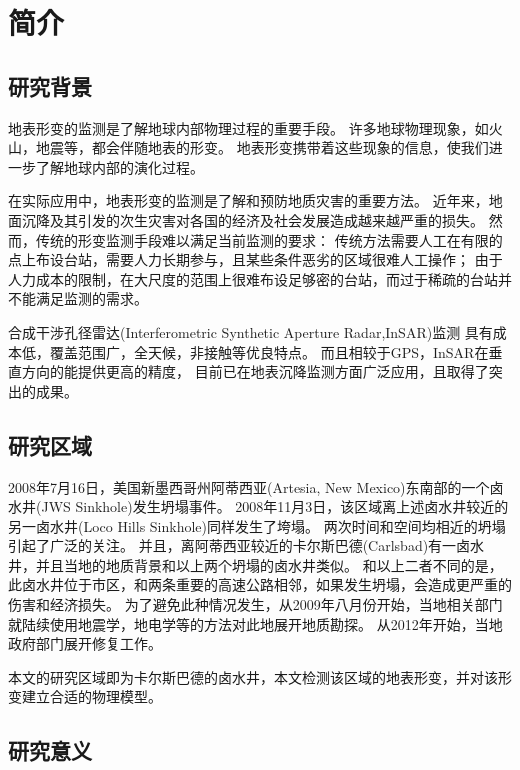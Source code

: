 
\chapter{简介}

\section{研究背景}

地表形变的监测是了解地球内部物理过程的重要手段。
许多地球物理现象，如火山，地震等，都会伴随地表的形变。
地表形变携带着这些现象的信息，使我们进一步了解地球内部的演化过程。

在实际应用中，地表形变的监测是了解和预防地质灾害的重要方法。
近年来，地面沉降及其引发的次生灾害对各国的经济及社会发展造成越来越严重的损失。
然而，传统的形变监测手段难以满足当前监测的要求：
传统方法需要人工在有限的点上布设台站，需要人力长期参与，且某些条件恶劣的区域很难人工操作；
由于人力成本的限制，在大尺度的范围上很难布设足够密的台站，而过于稀疏的台站并不能满足监测的需求。

合成干涉孔径雷达(Interferometric Synthetic Aperture Radar,InSAR)监测
具有成本低，覆盖范围广，全天候，非接触等优良特点。
而且相较于GPS，InSAR在垂直方向的能提供更高的精度，
目前已在地表沉降监测方面广泛应用，且取得了突出的成果。

\section{研究区域}

2008年7月16日，美国新墨西哥州阿蒂西亚(Artesia, New Mexico)东南部的一个卤水井(JWS Sinkhole)发生坍塌事件。
2008年11月3日，该区域离上述卤水井较近的另一卤水井(Loco Hills Sinkhole)同样发生了垮塌。
两次时间和空间均相近的坍塌引起了广泛的关注。
并且，离阿蒂西亚较近的卡尔斯巴德(Carlsbad)有一卤水井，并且当地的地质背景和以上两个坍塌的卤水井类似。
和以上二者不同的是，此卤水井位于市区，和两条重要的高速公路相邻，如果发生坍塌，会造成更严重的伤害和经济损失。
为了避免此种情况发生，从2009年八月份开始，当地相关部门就陆续使用地震学，地电学等的方法对此地展开地质勘探。
从2012年开始，当地政府部门展开修复工作。

本文的研究区域即为卡尔斯巴德的卤水井，本文检测该区域的地表形变，并对该形变建立合适的物理模型。

\section{研究意义}

